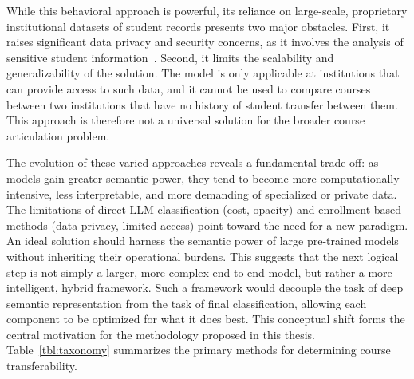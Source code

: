 While this behavioral approach is powerful, its reliance on large-scale, proprietary institutional datasets of student records presents two major obstacles. First, it raises significant data privacy and security concerns, as it involves the analysis of sensitive student information~\cite{slade10.1177/0002764213479366}. Second, it limits the scalability and generalizability of the solution. The model is only applicable at institutions that can provide access to such data, and it cannot be used to compare courses between two institutions that have no history of student transfer between them. This approach is therefore not a universal solution for the broader course articulation problem.

The evolution of these varied approaches reveals a fundamental trade-off: as models gain greater semantic power, they tend to become more computationally intensive, less interpretable, and more demanding of specialized or private data. The limitations of direct LLM classification (cost, opacity) and enrollment-based methods (data privacy, limited access) point toward the need for a new paradigm. An ideal solution should harness the semantic power of large pre-trained models without inheriting their operational burdens. This suggests that the next logical step is not simply a larger, more complex end-to-end model, but rather a more intelligent, hybrid framework. Such a framework would decouple the task of deep semantic representation from the task of final classification, allowing each component to be optimized for what it does best. This conceptual shift forms the central motivation for the methodology proposed in this thesis.  Table~\ref{tbl:taxonomy} summarizes the primary methods for determining course transferability.

